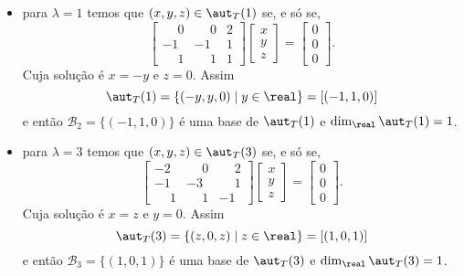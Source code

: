 \begin{exemplo}
\begin{enumerate}[label={\arabic*})]
\begin{solucao}
\begin{itemize}
                    \item para $\lambda = 1$ temos que $(x,y,z) \in \aut_T(1)$ se, e s\'o se,
                        \[
                            \begin{bmatrix}
                                \phantom{-}0 & \phantom{-}0 & 2\\
                                -1 & -1 & 1\\
                                \phantom{-}1 & \phantom{-}1 & 1
                            \end{bmatrix}\begin{bmatrix}
                                x\\y\\z
                            \end{bmatrix} = \begin{bmatrix}
                                0\\0\\0
                            \end{bmatrix}.
                        \]
                        Cuja solução é $x = -y$ e $z = 0$. Assim
                        \[
                            \aut_T(1) = \{(-y,y,0) \mid y \in \real\} = [(-1,1,0)]
                        \]
                        e então $\mathcal{B}_2 = \{(-1,1,0)\}$ é uma base de $\aut_T(1)$ e $\dim_\real\aut_T(1) = 1$.

                    \item para $\lambda = 3$ temos que $(x,y,z) \in \aut_T(3)$ se, e s\'o se,
                        \[
                            \begin{bmatrix}
                                -2 & \phantom{-}0 & \phantom{-}2\\
                                -1 & -3 & \phantom{-}1\\
                                \phantom{-}1 & \phantom{-}1 & -1
                            \end{bmatrix}\begin{bmatrix}
                                x\\y\\z
                            \end{bmatrix} = \begin{bmatrix}
                                0\\0\\0
                            \end{bmatrix}.
                        \]
                    Cuja solução é $x = z$ e $y = 0$. Assim
                    \[
                        \aut_T(3) = \{(z,0,z) \mid z \in \real\} = [(1,0,1)]
                    \]
                    e então $\mathcal{B}_3 = \{(1,0,1)\}$ é uma base de $\aut_T(3)$ e $\dim_\real\aut_T(3) = 1$.
            \end{itemize}


\end{solucao}
\end{enumerate}
\end{exemplo}
